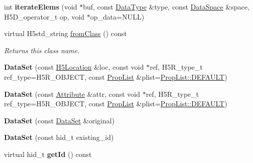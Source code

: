 \begin{DoxyCompactItemize}
int {\bfseries iterate\+Elems} (void $\ast$buf, const \hyperlink{class_h5_1_1_data_type}{Data\+Type} \&type, const \hyperlink{class_h5_1_1_data_space}{Data\+Space} \&space, H5\+D\+\_\+operator\+\_\+t op, void $\ast$op\+\_\+data=N\+U\+LL)
\item 
\mbox{\label{class_h5_1_1_data_set_a82b132213ea66c345e0533c34a0bd4c1}} 
virtual H5std\+\_\+string \hyperlink{class_h5_1_1_data_set_a82b132213ea66c345e0533c34a0bd4c1}{from\+Class} () const
\begin{DoxyCompactList}\small\item\em Returns this class name. \end{DoxyCompactList}\item 
\mbox{\label{class_h5_1_1_data_set_a47ddc5594fd966e21f11db0dc6c199bc}} 
{\bfseries Data\+Set} (const \hyperlink{class_h5_1_1_h5_location}{H5\+Location} \&loc, const void $\ast$ref, H5\+R\+\_\+type\+\_\+t ref\+\_\+type=H5\+R\+\_\+\+O\+B\+J\+E\+CT, const \hyperlink{class_h5_1_1_prop_list}{Prop\+List} \&plist=\hyperlink{class_h5_1_1_prop_list_ae52af66ce82af0ea7e6dc57148c56241}{Prop\+List\+::\+D\+E\+F\+A\+U\+LT})
\item 
\mbox{\label{class_h5_1_1_data_set_a598e5d1f1de88333a2e406cf91638b27}} 
{\bfseries Data\+Set} (const \hyperlink{class_h5_1_1_attribute}{Attribute} \&attr, const void $\ast$ref, H5\+R\+\_\+type\+\_\+t ref\+\_\+type=H5\+R\+\_\+\+O\+B\+J\+E\+CT, const \hyperlink{class_h5_1_1_prop_list}{Prop\+List} \&plist=\hyperlink{class_h5_1_1_prop_list_ae52af66ce82af0ea7e6dc57148c56241}{Prop\+List\+::\+D\+E\+F\+A\+U\+LT})
\item 
\mbox{\label{class_h5_1_1_data_set_a224114f6fd3fdb01300ffcfd5e5192d5}} 
{\bfseries Data\+Set} (const \hyperlink{class_h5_1_1_data_set}{Data\+Set} \&original)
\item 
\mbox{\label{class_h5_1_1_data_set_a283d6e80f93309c1ee09a4c6a8dd574c}} 
{\bfseries Data\+Set} (const hid\+\_\+t existing\+\_\+id)
\item 
\mbox{\label{class_h5_1_1_data_set_a4eedfd16bd2361ff12c191db4d1d9844}} 
virtual hid\+\_\+t {\bfseries get\+Id} () const
\end{DoxyCompactItemize}
